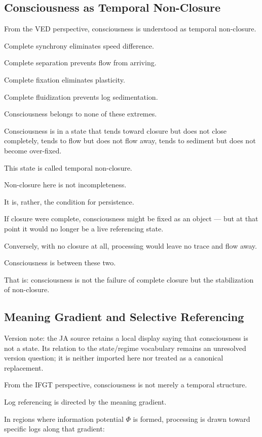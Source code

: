 \subsection{Consciousness as Temporal Non-Closure}


From the VED perspective, consciousness is understood as temporal non-closure.

Complete synchrony eliminates speed difference.

Complete separation prevents flow from arriving.

Complete fixation eliminates plasticity.

Complete fluidization prevents log sedimentation.

Consciousness belongs to none of these extremes.

Consciousness is in a state that tends toward closure but does not close completely, tends to flow but does not flow away, tends to sediment but does not become over-fixed.

This state is called temporal non-closure.

Non-closure here is not incompleteness.

It is, rather, the condition for persistence.

If closure were complete, consciousness might be fixed as an object — but at that point it would no longer be a live referencing state.

Conversely, with no closure at all, processing would leave no trace and flow away.

Consciousness is between these two.

That is: consciousness is not the failure of complete closure but the stabilization of non-closure.

\subsection{Meaning Gradient and Selective Referencing}

Version note: the JA source retains a local display saying that consciousness is not a state. Its relation to the state/regime vocabulary remains an unresolved version question; it is neither imported here nor treated as a canonical replacement.


From the IFGT perspective, consciousness is not merely a temporal structure.

Log referencing is directed by the meaning gradient.

In regions where information potential $\Phi$ is formed, processing is drawn toward specific logs along that gradient:

